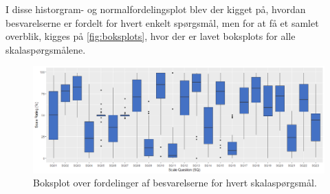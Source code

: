 \noindent
%
I disse historgram- og normalfordelingsplot blev der kigget på, hvordan besvarelserne er fordelt for hvert enkelt spørgsmål, men for at få et samlet overblik, kigges på \autoref{fig:boksplots}, hvor der er lavet boksplots for alle skalaspørgsmålene. 
%
\begin{figure}[H]
\centering
\includegraphics[width = \textwidth]{Figure/DatabehandlingSkalaer/BoksplotUden0er} 
\caption{Boksplot over fordelinger af besvarelserne for hvert skalaspørgsmål.}
\label{fig:boksplots}
\end{figure}
\noindent
%


